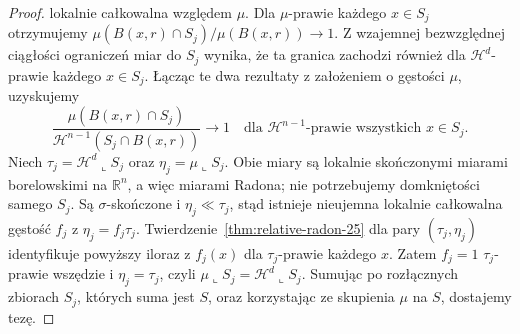 \begin{proof}
lokalnie całkowalna względem $\mu$.
Dla $\mu$-prawie każdego $x\in S_j$ otrzymujemy
$\mu(B(x,r)\cap S_j)/\mu(B(x,r))\to1$.
Z wzajemnej bezwzględnej ciągłości ograniczeń
miar do $S_j$ wynika, że ta granica zachodzi
również dla $\mathcal H^d$-prawie każdego $x\in S_j$.
Łącząc te dwa rezultaty z założeniem o gęstości
$\mu$, uzyskujemy
\[
 \frac{\mu(B(x,r)\cap S_j)}
 {\mathcal H^{n-1}(S_j\cap B(x,r))}
 \longrightarrow1
 \quad\text{dla }\mathcal H^{n-1}\text{-prawie wszystkich }x\in S_j.
\]
Niech $\tau_j=\mathcal H^d\llcorner S_j$
oraz $\eta_j=\mu\llcorner S_j$. Obie miary są
lokalnie skończonymi miarami borelowskimi
na $\mathbb R^n$, a więc miarami Radona;
nie potrzebujemy domkniętości samego $S_j$.
Są $\sigma$-skończone i $\eta_j\ll\tau_j$,
stąd istnieje nieujemna lokalnie całkowalna
gęstość $f_j$ z $\eta_j=f_j\tau_j$.
Twierdzenie~\ref{thm:relative-radon-25} dla pary
$(\tau_j,\eta_j)$ identyfikuje powyższy iloraz
z $f_j(x)$ dla $\tau_j$-prawie każdego $x$.
Zatem $f_j=1$ $\tau_j$-prawie wszędzie i
$\eta_j=\tau_j$, czyli
$\mu\llcorner S_j=\mathcal H^d\llcorner S_j$.
Sumując po rozłącznych zbiorach $S_j$,
których suma jest $S$, oraz korzystając
ze skupienia $\mu$ na $S$, dostajemy tezę.
\end{proof}

